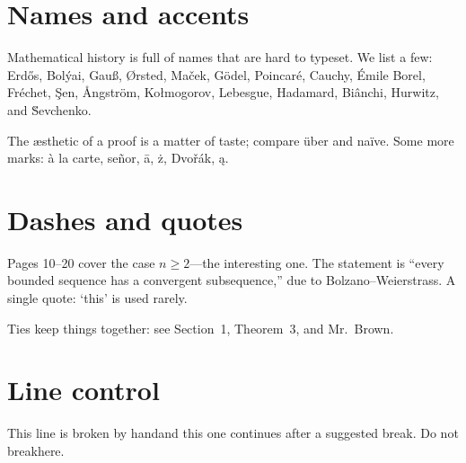 \documentclass[12pt,a4paper]{article}
\begin{document}
\section{Names and accents}
Mathematical history is full of names that are hard to typeset. We list a few: Erd\H{o}s, Bol\'yai, Gau\ss, \O rsted, Ma\v{c}ek, G\"odel, Poincar\'e, Cauchy, \'Emile Borel, Fr\'echet, \c{S}en, \r{A}ngstr\"om, Ko\l{}mogorov, Lebesgue, Hadamard, Bi\^anchi, Hurwitz, and \u{S}evchenko.

The \ae sthetic of a proof is a matter of taste; compare \"uber and na\"ive.  Some more marks: \`a la carte, se\~nor, \=a, \.z, Dvo\v{r}\'ak, \k{a}.

\section{Dashes and quotes}
Pages 10--20 cover the case $n\ge2$---the interesting one. The statement is ``every bounded sequence has a convergent subsequence,'' due to Bolzano--Weierstrass. A single quote: `this' is used rarely.

Ties keep things together: see Section~1, Theorem~3, and Mr.~Brown.

\section{Line control}
This line is broken by hand\newline and this one \linebreak[4]continues after a suggested break. Do not break\nolinebreak[4] here.
\end{document}
